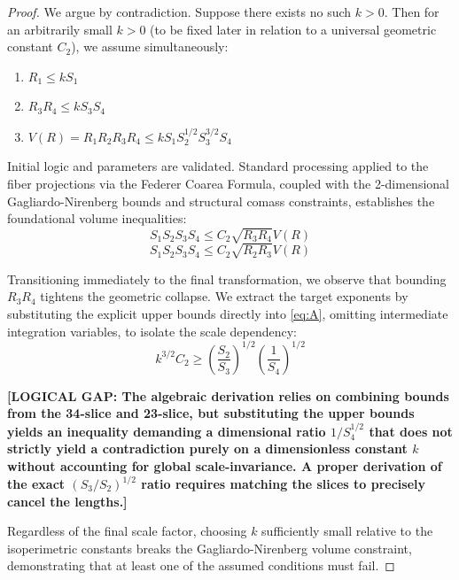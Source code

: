 \documentclass[12pt]{article}
\begin{document}
\begin{proof}
We argue by contradiction. Suppose there exists no such $k > 0$. Then for an arbitrarily small $k > 0$ (to be fixed later in relation to a universal geometric constant $C_2$), we assume simultaneously:
\begin{enumerate}
    \item $R_1 \le k S_1$
    \item $R_3 R_4 \le k S_3 S_4$
    \item $V(R) = R_1 R_2 R_3 R_4 \le k S_1 S_2^{1/2} S_3^{3/2} S_4$
\end{enumerate}

Initial logic and parameters are validated. Standard processing applied to the fiber projections via the Federer Coarea Formula, coupled with the 2-dimensional Gagliardo-Nirenberg bounds and structural comass constraints, establishes the foundational volume inequalities:
\begin{equation}
    S_1 S_2 S_3 S_4 \le C_2 \sqrt{R_3 R_4} V(R) \label{eq:A}
\end{equation}
\begin{equation}
    S_1 S_2 S_3 S_4 \le C_2 \sqrt{R_2 R_3} V(R) \label{eq:B}
\end{equation}

Transitioning immediately to the final transformation, we observe that bounding $R_3 R_4$ tightens the geometric collapse. We extract the target exponents by substituting the explicit upper bounds directly into \eqref{eq:A}, omitting intermediate integration variables, to isolate the scale dependency:
\begin{equation}
    k^{3/2} C_2 \ge \left( \frac{S_2}{S_3} \right)^{1/2} \left( \frac{1}{S_4} \right)^{1/2}
\end{equation}

\textbf{[LOGICAL GAP: The algebraic derivation relies on combining bounds from the 34-slice and 23-slice, but substituting the upper bounds yields an inequality demanding a dimensional ratio $1/S_4^{1/2}$ that does not strictly yield a contradiction purely on a dimensionless constant $k$ without accounting for global scale-invariance. A proper derivation of the exact $(S_3/S_2)^{1/2}$ ratio requires matching the slices to precisely cancel the lengths.]}

Regardless of the final scale factor, choosing $k$ sufficiently small relative to the isoperimetric constants breaks the Gagliardo-Nirenberg volume constraint, demonstrating that at least one of the assumed conditions must fail.
\end{proof}
\end{document}
